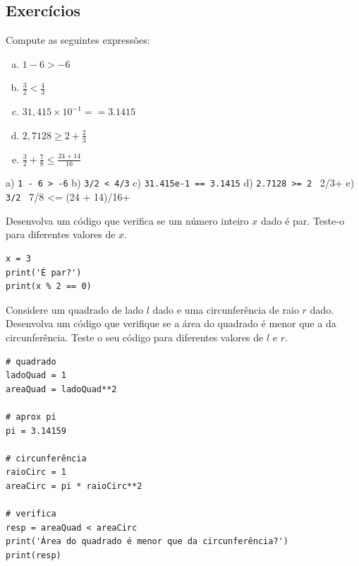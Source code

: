 \ifisbook
\newpage
\fi

\subsection{Exercícios}

\begin{exer}
  Compute as seguintes expressões:
  \begin{enumerate}[a)]
  \item $1 - 6 > -6$\\
  \item $\frac{3}{2} < \frac{4}{3}$\\
  \item $31,415\times 10^{-1} == 3.1415$\\
  \item $\displaystyle 2,7128 \geq 2 + \frac{2}{3}$
  \item $\displaystyle \frac{3}{2} + \frac{7}{8} \leq \frac{24 + 14}{16}$
  \end{enumerate}
\end{exer}
\begin{resp}
  a) \lstinline+1 - 6 > -6+ b) \lstinline+3/2 < 4/3+ c) \lstinline+31.415e-1 == 3.1415+ d) \lstinline+2.7128 >= 2 + 2/3+ e) \lstinline+3/2 + 7/8 <= (24 + 14)/16+
\end{resp}

\begin{exer}
  Desenvolva um código que verifica se um número inteiro $x$ dado é par. Teste-o para diferentes valores de $x$.
\end{exer}
\begin{resp}

\begin{lstlisting}
x = 3
print('É par?')
print(x % 2 == 0)
\end{lstlisting}

\end{resp}

\begin{exer}
  Considere um quadrado de lado $l$ dado e uma circunferência de raio $r$ dado. Desenvolva um código que verifique se a área do quadrado é menor que a da circunferência. Teste o seu código para diferentes valores de $l$ e $r$.
\end{exer}
\begin{resp}

\begin{lstlisting}
# quadrado
ladoQuad = 1
areaQuad = ladoQuad**2

# aprox pi
pi = 3.14159

# circunferência
raioCirc = 1
areaCirc = pi * raioCirc**2

# verifica
resp = areaQuad < areaCirc
print('Área do quadrado é menor que da circunferência?')
print(resp)
\end{lstlisting}

\end{resp}

